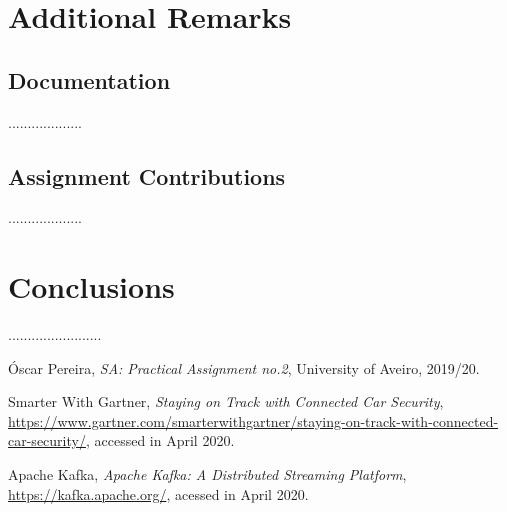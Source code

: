 \documentclass[12pt]{article}
\begin{document}
\newpage
\section{Additional Remarks} %

\subsection{Documentation} %

...................

\subsection{Assignment Contributions} %

...................

\section*{Conclusions} %

........................

\begin{thebibliography}{9} %
  

    Óscar Pereira,
    \textit{SA: Practical Assignment no.2},
    University of Aveiro,
    2019/20.
  
    Smarter With Gartner,
    \textit{Staying on Track with Connected Car Security},
    \url{https://www.gartner.com/smarterwithgartner/staying-on-track-with-connected-car-security/},
    accessed in April 2020.

    Apache Kafka,
    \textit{Apache Kafka: A Distributed Streaming Platform},
    \url{https://kafka.apache.org/},
    acessed in April 2020.


    

\end{thebibliography}

\clearpage
\end{document}

